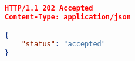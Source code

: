 

\begin{lstlisting}[language=json,firstnumber=1]
HTTP/1.1 202 Accepted
Content-Type: application/json

{
    "status": "accepted"
}

\end{lstlisting}